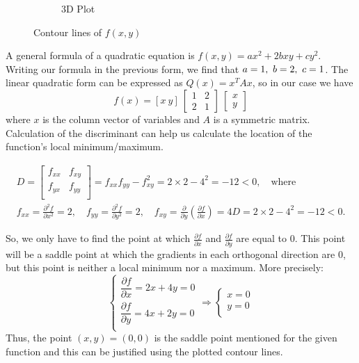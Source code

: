 \begin{figure}[h]
\begin{subfigure}{0.4\textwidth}
		\caption{3D Plot}
		\label{fig:prob_1_contour_lines_3d}
	\end{subfigure}
	\caption{Contour lines of $f(x,y)$ }
	\label{fig:prob_1_contour_lines}
\end{figure}

A general formula of a quadratic equation is $f(x,y) = ax^2 + 2bxy + cy^2$. Writing our formula in the previous form, we find that $a=1, \  b=2, \  c=1$.
The linear quadratic form can be expressed as $Q(x) = x^T Ax$, so in our case we have 
\[
f(x) = \left[x \ y\right] \ \left[
\begin{array}{cc}
	1 & 2 \\
	2 & 1	
\end{array}
\right] \ \left[
\begin{array}{c}
	x\\y
\end{array}
\right]
\]
where $x$ is the column vector of variables and $A$ is a symmetric matrix.
Calculation of the discriminant can help us calculate the location of the function's local minimum/maximum.

\begin{equation}
\begin{gathered}
D =
\left[
\begin{array}{cc}
	f_{xx} & f_{xy} \\
	f_{yx} & f_{yy} \\
\end{array}
\right]
= f_{xx} f_{yy} - f^2_{xy} = 2 \times 2 - 4^2 = -12 < 0, \quad \text{where} \\
f_{xx} = \frac{\partial^2 f}{\partial x^2} = 2, \quad
f_{yy} = \frac{\partial^2 f}{\partial y^2} = 2, \quad
f_{xy} = \frac{\partial}{\partial y} \left( \frac{\partial f}{\partial x} \right) = 4
D = 2 \times 2 - 4^2 = -12 < 0.
\end{gathered}
\end{equation}

So, we only have to find the point at which $\frac{\partial f}{\partial x}$ and $\frac{\partial f}{\partial y}$ are equal to $0$. This point will be a saddle point at which the gradients in each orthogonal direction are $0$, but this point is neither a local minimum nor a maximum.
More precisely:
\begin{equation}
\left\{
\begin{array}{c}
	\dfrac{\partial f}{\partial x} = 2x + 4y = 0 \\[4mm]
	\dfrac{\partial f}{\partial y} = 4x + 2y = 0 \\
\end{array}
\right.
\Rightarrow
\left\{
\begin{array}{c}
	x = 0\\y=0\\
\end{array}
\right.
\end{equation}
Thus, the point $(x,y) = (0,0)$ is the saddle point mentioned for the given function and this can be justified using the plotted contour lines.